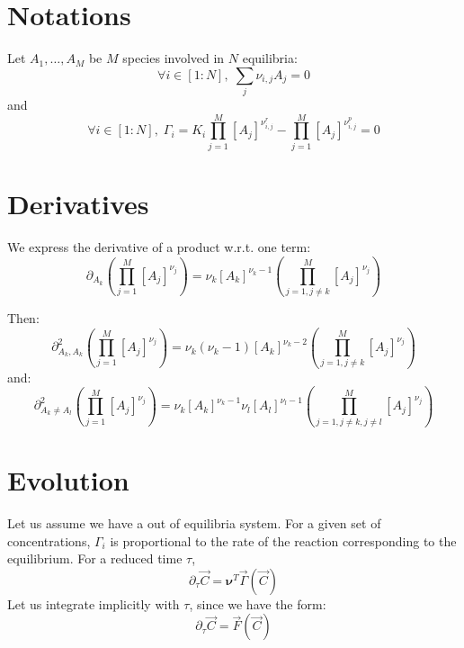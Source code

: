 \documentclass[aps,12pt]{revtex4}
\begin{document}
\section{Notations}

Let $A_1,\ldots,A_M$ be $M$ species involved in $N$ equilibria:
\begin{equation}
	\forall i\in[1:N], \; \sum_j \nu_{i,j} A_j = 0
\end{equation}
and
\begin{equation}
	\forall i\in[1:N], \; 
	\Gamma_i = K_i \prod_{j=1}^{M} [A_j]^{\nu^r_{i,j}} 
	- \prod_{j=1}^{M} [A_j]^{\nu^p_{i,j}} = 0
\end{equation}

\section{Derivatives}
We express the derivative of a product w.r.t. one term:
\begin{equation}
	\partial_{A_k} \left( \prod_{j=1}^{M} [A_j]^{\nu_{j}} \right)  =
	\nu_k [A_k]^{\nu_k-1} \left( \prod_{j=1,j\not=k}^{M} [A_j]^{\nu_{j}} \right)
\end{equation}

Then:
\begin{equation}
	\partial^2_{A_k, A_k} \left( \prod_{j=1}^{M} [A_j]^{\nu_{j}} \right)  =
	\nu_k (\nu_k-1) [A_k]^{\nu_k-2} \left( \prod_{j=1,j\not=k}^{M} [A_j]^{\nu_{j}} \right)
\end{equation}
and:
\begin{equation}
	\partial^2_{A_k\not=A_l} \left( \prod_{j=1}^{M} [A_j]^{\nu_{j}} \right)  =
	\nu_k [A_k]^{\nu_k-1} \nu_l [A_l]^{\nu_l-1}\left( \prod_{j=1,j\not=k,j\not=l}^{M} [A_j]^{\nu_{j}} \right)
\end{equation}

\section{Evolution}
Let us assume we have a out of equilibria system.
For a given set of concentrations, $\Gamma_i$ is proportional
to the rate of the reaction corresponding to the equilibrium.
For a reduced time $\tau$,
\begin{equation}
	\partial_\tau \vec{C} = \bm{\nu}^T    \vec{\Gamma}(\vec{C})
\end{equation}
Let us integrate implicitly with $\tau$, since we have the form:
\begin{equation}
	\partial_\tau \vec{C} = \vec{F}(\vec{C})
\end{equation}
\end{document}
